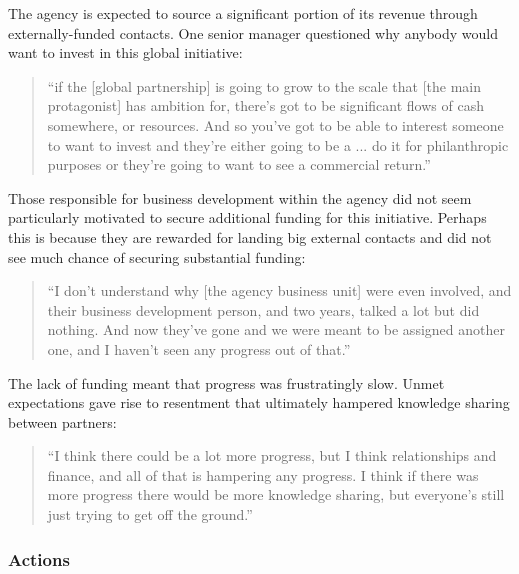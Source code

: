 The agency is expected to source a significant portion of its revenue through externally-funded contacts. One senior manager questioned why anybody would want to invest in this global initiative:

\begin{quote}
\small
\enquote{if the [global partnership] is going to grow to the scale that [the main protagonist] has ambition for, there's got to be significant flows of cash somewhere, or resources. And so you've got to be able to interest someone to want to invest and they're either going to be a ... do it for philanthropic purposes or they're going to want to see a commercial return.} \\
\end{quote}
 
Those responsible for business development within the agency did not seem particularly motivated to secure additional funding for this initiative. Perhaps this is because they are rewarded for landing big external contacts and did not see much chance of securing substantial funding:

\begin{quote}
\small
\enquote{I don't understand why [the agency business unit] were even involved, and their business development person, and two years, talked a lot but did nothing. And now they've gone and we were meant to be assigned another one, and I haven't seen any progress out of that.} \\
\end{quote}
 
The lack of funding meant that progress was frustratingly slow. Unmet expectations gave rise to resentment that ultimately hampered knowledge sharing between partners: 

\begin{quote}
\small
\enquote{I think there could be a lot more progress, but I think relationships and finance, and all of that is hampering any progress. I think if there was more progress there would be more knowledge sharing, but everyone's still just trying to get off the ground.} \\
\end{quote}

\subsubsection{Actions}

